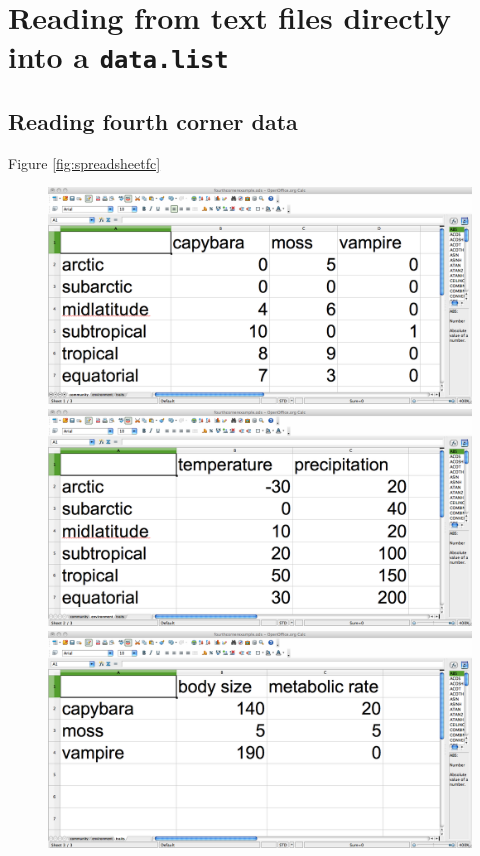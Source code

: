 \documentclass{article}
\newcommand{\code}[1]{\texttt{#1}}
\numberwithin{exercise}{section}
\begin{document}
\section{Reading from text files directly into a \code{data.list}}

\subsection{Reading fourth corner data}

Figure \ref{fig:spreadsheetfc} \begin{figure}
\includegraphics{./readingmultipletables/community.png}
\includegraphics{./readingmultipletables/environment.png}
\includegraphics{./readingmultipletables/traits.png}

\end{figure}
\end{document}
